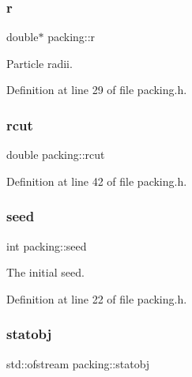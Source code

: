 \subsubsection{\texorpdfstring{r}{r}}
{\footnotesize\ttfamily double$\ast$ packing\+::r\hspace{0.3cm}{\ttfamily [protected]}}



Particle radii. 



Definition at line 29 of file packing.\+h.

\mbox{\label{classpacking_aefd159c50069573f1f2a3a6f0ff50984}} 
\subsubsection{\texorpdfstring{rcut}{rcut}}
{\footnotesize\ttfamily double packing\+::rcut\hspace{0.3cm}{\ttfamily [protected]}}



Definition at line 42 of file packing.\+h.

\mbox{\label{classpacking_aa5a588c50b2c22b3c2917a2da12f33e5}} 
\subsubsection{\texorpdfstring{seed}{seed}}
{\footnotesize\ttfamily int packing\+::seed\hspace{0.3cm}{\ttfamily [protected]}}



The initial seed. 



Definition at line 22 of file packing.\+h.

\mbox{\label{classpacking_a7d70ed77edfe21649b824f01d26432d0}} 
\subsubsection{\texorpdfstring{statobj}{statobj}}
{\footnotesize\ttfamily std\+::ofstream packing\+::statobj\hspace{0.3cm}{\ttfamily [protected]}}



